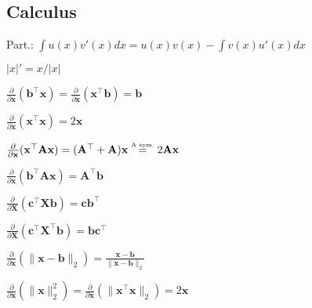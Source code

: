 \subsection*{Calculus}
\begin{inparaitem}[\color{red}\textbullet]
	\item Part.: $\int u(x)v'(x) dx = u(x)v(x) - \int v(x)u'(x) dx$\\
	\item $|x|'=x/|x|$\\
	\item $\frac{\partial}{\partial \mathbf{x}}(\mathbf{b}^\top \mathbf{x}) = \frac{\partial}{\partial \mathbf{x}}(\mathbf{x}^\top \mathbf{b}) = \mathbf{b}$
	\item $\frac{\partial}{\partial \mathbf{x}}(\mathbf{x}^\top \mathbf{x}) = 2\mathbf{x}$ \\
	\item $\frac{\partial}{\partial \mathbf{x}}(\mathbf{x}^\top \mathbf{A}\mathbf{x}) = (\mathbf{A}^\top + \mathbf{A})\mathbf{x} \stackrel{\text{\tiny A sym.}}{=} 2\mathbf{A}\mathbf{x}$ \\
	\item $\frac{\partial}{\partial \mathbf{x}}(\mathbf{b}^\top \mathbf{A}\mathbf{x}) = \mathbf{A}^\top \mathbf{b}$
	\item $\frac{\partial}{\partial \mathbf{X}}(\mathbf{c}^\top \mathbf{X} \mathbf{b}) = \mathbf{c}\mathbf{b}^\top$ \\
	\item $\frac{\partial}{\partial \mathbf{X}}(\mathbf{c}^\top \mathbf{X}^\top \mathbf{b}) = \mathbf{b}\mathbf{c}^\top$
	\item $\frac{\partial}{\partial \mathbf{x}}(\| \mathbf{x}-\mathbf{b} \|_2) = \frac{\mathbf{x}-\mathbf{b}}{\|\mathbf{x}-\mathbf{b}\|_2}$ \\
	\item $\frac{\partial}{\partial \mathbf{x}}(\|\mathbf{x}\|^2_2) = \frac{\partial}{\partial \mathbf{x}} (\|\mathbf{x}^\top \mathbf{x}\|_2) = 2\mathbf{x}$\\

\end{inparaitem}
